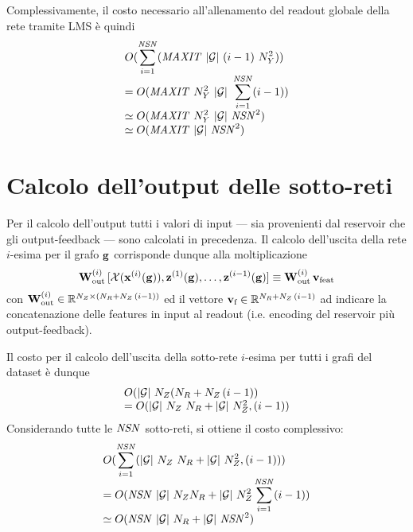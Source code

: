 Complessivamente, il costo necessario all'allenamento del readout globale della rete tramite LMS è quindi
\begin{equation}
\begin{array}{l}
\displaystyle O(\sum_{i=1}^{\mathit{NSN}} (\mathit{MAXIT}\ \lvert\mathcal{G}\rvert\ (i-1)\ N_Y^2)) \\
\displaystyle = O(\mathit{MAXIT}\ N_Y^2\ \lvert\mathcal{G}\rvert\ \sum_{i=1}^{\mathit{NSN}} (i-1)) \\
\displaystyle \simeq O(\mathit{MAXIT}\ N_Y^2\ \lvert\mathcal{G}\rvert\ \mathit{NSN}^2) \\
\displaystyle \simeq O(\mathit{MAXIT}\ \lvert\mathcal{G}\rvert\ \mathit{NSN}^2) \\
\end{array}
\end{equation}


\section{Calcolo dell'output delle sotto-reti}\label{app:costo:out_sub}
Per il calcolo dell'output tutti i valori di input --- sia provenienti dal reservoir che gli output-feedback --- sono calcolati in precedenza. Il calcolo dell'uscita della rete $i$-esima per il grafo $\mathbf{g}$ corrisponde dunque alla moltiplicazione
\begin{equation}\label{app:eq:ro:sub}
\matr{W}^{(i)}_\textup{out} \,
		[\mathcal{X}(\vect{x}^{(i)}(\graph{g})), \vect{z}^{(1)}(\graph{g}), \dots, \vect{z}^{(i-1)}(\graph{g})]
\equiv \matr{W}^{(i)}_\textup{out} \, \vect{v}_\textup{feat} 
\end{equation}
con $\matr{W}^{(i)}_\textup{out} \in \R^{\Nz \times (\Nr + \Nz\, (i-1))}$ ed il vettore  $\mathbf{v}_\textup{f} \in \mathbb{R}^{N_R + N_Z\, (i-1)}$ ad indicare la concatenazione delle features in input al readout (i.e. encoding del reservoir più output-feedback).

Il costo per il calcolo dell'uscita della sotto-rete $i$-esima per tutti i grafi del dataset è dunque
\begin{equation}
\begin{array}{l}
O(\lvert\mathcal{G}\rvert\ N_Z (N_R + N_Z\, (i-1)) \\
= O(\lvert\mathcal{G}\rvert\ N_Z\ N_R + \lvert\mathcal{G}\rvert\ N_Z^2, (i-1)) \\
\end{array}
\end{equation}
Considerando tutte le $\mathit{NSN}$ sotto-reti, si ottiene il costo complessivo:
\begin{equation}
\begin{array}{l}
\displaystyle O(\sum_{i=1}^{\mathit{NSN}} (\lvert\mathcal{G}\rvert\ N_Z\ N_R + \lvert\mathcal{G}\rvert\ N_Z^2, (i-1))) \\
\displaystyle = O(\mathit{NSN}\ \lvert\mathcal{G}\rvert\ N_Z N_R + \lvert\mathcal{G}\rvert\ N_Z^2 \sum_{i=1}^{\mathit{NSN}} (i-1))\\
\displaystyle \simeq O(\mathit{NSN}\ \lvert\mathcal{G}\rvert\ N_R + \lvert\mathcal{G}\rvert\ \mathit{NSN}^2)
\end{array}
\end{equation}

